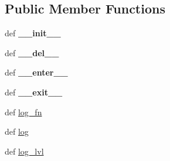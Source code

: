 \subsection*{Public Member Functions}
\begin{DoxyCompactItemize}
\item 
\hypertarget{classcheshire3_1_1logger_1_1_simple_logger_a8517368bf7d98aacf13cdaec345525fd}{def {\bfseries \-\_\-\-\_\-init\-\_\-\-\_\-}}\label{classcheshire3_1_1logger_1_1_simple_logger_a8517368bf7d98aacf13cdaec345525fd}

\item 
\hypertarget{classcheshire3_1_1logger_1_1_simple_logger_a5cad57e300e1031a8336eebd1d768b7c}{def {\bfseries \-\_\-\-\_\-del\-\_\-\-\_\-}}\label{classcheshire3_1_1logger_1_1_simple_logger_a5cad57e300e1031a8336eebd1d768b7c}

\item 
\hypertarget{classcheshire3_1_1logger_1_1_simple_logger_a7c01ba7e7c4333308e0eb41ebc8cedbe}{def {\bfseries \-\_\-\-\_\-enter\-\_\-\-\_\-}}\label{classcheshire3_1_1logger_1_1_simple_logger_a7c01ba7e7c4333308e0eb41ebc8cedbe}

\item 
\hypertarget{classcheshire3_1_1logger_1_1_simple_logger_a20c2171dc3f5df5232426a16d51f9155}{def {\bfseries \-\_\-\-\_\-exit\-\_\-\-\_\-}}\label{classcheshire3_1_1logger_1_1_simple_logger_a20c2171dc3f5df5232426a16d51f9155}

\item 
def \hyperlink{classcheshire3_1_1logger_1_1_simple_logger_a0adaad94487e196326e6c609f1a14c0b}{log\-\_\-fn}
\item 
def \hyperlink{classcheshire3_1_1logger_1_1_simple_logger_a99e3e3947c6e2d43613cbc8764d61d0e}{log}
\item 
def \hyperlink{classcheshire3_1_1logger_1_1_simple_logger_ad595a002416bead25edf60d452430e85}{log\-\_\-lvl}
\end{DoxyCompactItemize}
